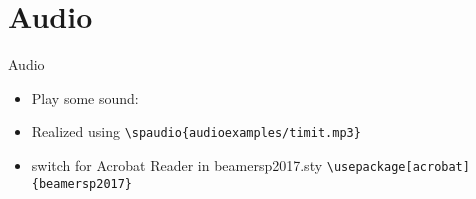 \section{Audio}


\begin{frame}[c, fragile]{Audio}
    \begin{itemize}
        \item Play some sound:  
        \item Realized using \verb|\spaudio{audioexamples/timit.mp3}|
        \item switch for Acrobat Reader in beamersp2017.sty \verb|\usepackage[acrobat]{beamersp2017}|
    \end{itemize}
\end{frame}
